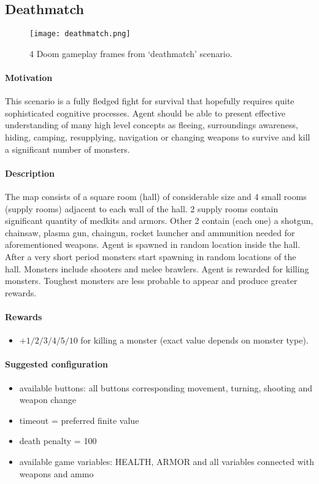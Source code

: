 	\subsection{Deathmatch}
		\begin{figure}
			\centering
			\texttt{[image: deathmatch.png]}
			\caption{4 Doom gameplay frames from `deathmatch' scenario.}\label{fig:deatchmatch}
		\end{figure}
		\paragraph{Motivation} 
	 		This scenario is a fully fledged fight for survival that hopefully requires quite sophisticated cognitive processes. Agent should be able to present effective understanding of many high level concepts as fleeing, surroundings awareness, hiding, camping, resupplying, navigation or changing weapons to survive and kill a significant number of monsters.

		\paragraph{Description}
			The map consists of a square room (hall) of considerable size and 4 small rooms (supply rooms) adjacent to each wall of the hall. 2 supply rooms contain significant quantity of medkits and armors. Other 2 contain (each one) a shotgun, chainsaw, plasma gun, chaingun, rocket launcher and ammunition needed for aforementioned weapons. Agent is spawned in random location inside the hall. After a very short period monsters start spawning in random locations of the hall. Monsters include shooters and melee brawlers. Agent is rewarded for killing monsters. Toughest monsters are less probable to appear and produce greater rewards.
		\paragraph{Rewards}
			\begin{itemize}
				\item $+1/2/3/4/5/10$ for killing a monster (exact value depends on monster type).
			\end{itemize}
		
		\paragraph{Suggested configuration}
			\begin{itemize}
				\item available buttons: all buttons corresponding movement, turning, shooting and weapon change 
				\item timeout = preferred finite value
				\item death penalty = 100
				\item available game variables: HEALTH, ARMOR and all variables connected with weapons and ammo
			\end{itemize}		
	\newpage

